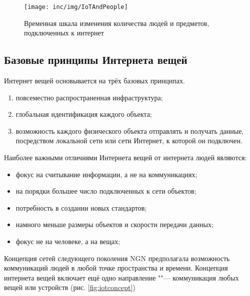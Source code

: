 \begin{figure}
  \centering
  \texttt{[image: inc/img/IoTAndPeople]}
	\caption{Временная шкала изменения количества людей и предметов, подключенных к интернет \cite{evans2011internet}}
  \label{fig:iotandpeople}
\end{figure}


\subsection{Базовые принципы Интернета вещей}

Интернет вещей основывается на трёх базовых принципах\cite{roslyakov2014}.
\begin{enumerate}
	\item повсеместно распространенная инфраструктура;
	\item глобальная идентификация каждого объекта;
	\item возможность каждого физического объекта отправлять и получать данные, посредством локальной сети или сети Интернет, к которой он подключен.
\end{enumerate}

Наиболее важными отличиями Интернета вещей от интернета людей являются:
\begin{itemize}
	\item фокус на считывание информации, а не на коммуникациях;
	\item на порядки большее число подключенных к сети объектов;
	\item потребность в создании новых стандартов;
	\item намного меньше размеры объектов и скорости передачи данных;
	\item фокус не на человеке, а на вещах;
\end{itemize}

Концепция сетей следующего поколения NGN предполагала возможность коммуникаций людей в любой точке пространства и времени.
Концепция интернета вещей включает ещё одно направление ""--- коммуникация любых вещей или устройств (рис. \ref{fig:iotconcept})

